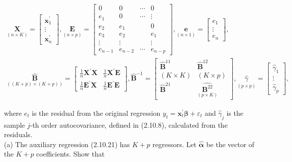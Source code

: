 \documentclass[10pt]{article}
\begin{document}
$$
\begin{gathered}
\underset{(n \times K)}{\mathbf{X}}=\left[\begin{array}{c}
\mathbf{x}_{1}^{\prime} \\
\vdots \\
\mathbf{x}_{n}^{\prime}
\end{array}\right], \underset{(n \times p)}{\mathbf{E}}=\left[\begin{array}{cccc}
0 & 0 & \cdots & 0 \\
e_{1} & 0 & \cdots & \vdots \\
e_{2} & e_{1} & & 0 \\
e_{3} & e_{2} & & e_{1} \\
\vdots & \vdots & & \vdots \\
e_{n-1} & e_{n-2} & \cdots & e_{n-p}
\end{array}\right], \underset{(n \times 1)}{\mathbf{e}}=\left[\begin{array}{c}
e_{1} \\
\vdots \\
e_{n}
\end{array}\right], \\
\underset{((K+p) \times(K+p))}{\widehat{\mathbf{B}}}=\left[\begin{array}{cc}
\frac{1}{n} \mathbf{X}^{\prime} \mathbf{X} & \frac{1}{n} \mathbf{X}^{\prime} \mathbf{E} \\
\frac{1}{n} \mathbf{E}^{\prime} \mathbf{X} & \frac{1}{n} \mathbf{E}^{\prime} \mathbf{E}
\end{array}\right], \widehat{\mathbf{B}}^{-1}=\left[\begin{array}{cc}
\widehat{\mathbf{B}}^{11} & \widehat{\mathbf{B}}^{12} \\
(K \times K) & (K \times p) \\
\widehat{\mathbf{B}}^{21} & \underset{(p \times K)}{\widehat{\mathbf{B}^{22}}}
\end{array}\right], \underset{(p \times p)}{\hat{\gamma}}=\left[\begin{array}{c}
\hat{\gamma}_{1} \\
\vdots \\
\hat{\gamma}_{p}
\end{array}\right],
\end{gathered}
$$

where $e_{t}$ is the residual from the original regression $y_{t}=\mathbf{x}_{t}^{\prime} \boldsymbol{\beta}+\varepsilon_{t}$ and $\hat{\gamma}_{j}$ is the sample $j$-th order autocovariance, defined in (2.10.8), calculated from the residuals.\\
(a) The auxiliary regression (2.10.21) has $K+p$ regressors. Let $\hat{\boldsymbol{\alpha}}$ be the vector of the $K+p$ coefficients. Show that
\end{document}
